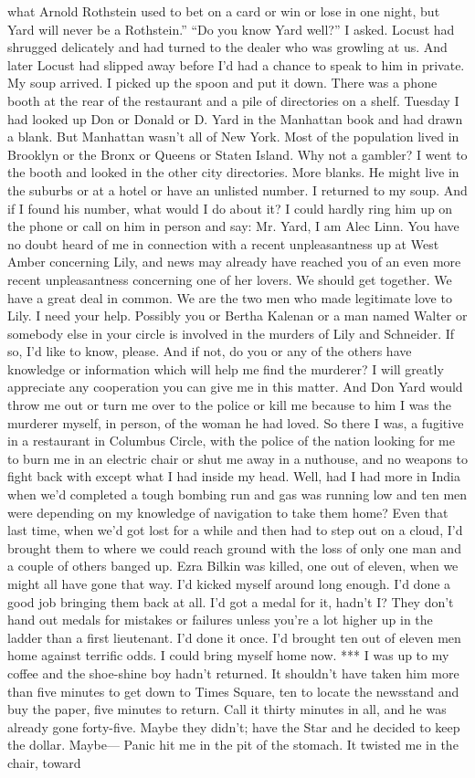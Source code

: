 \documentclass{novel}
\begin{document}
what Arnold Rothstein used to bet on a card or win or lose in one night, but Yard will never be a Rothstein.” “Do you know Yard well?” I asked. Locust had shrugged delicately and had turned to the dealer who was growling at us. And later Locust had slipped away before I’d had a chance to speak to him in private. My soup arrived. I picked up the spoon and put it down. There was a phone booth at the rear of the restaurant and a pile of directories on a shelf. Tuesday I had looked up Don or Donald or D. Yard in the Manhattan book and had drawn a blank. But Manhattan wasn’t all of New York. Most of the population lived in Brooklyn or the Bronx or Queens or Staten Island. Why not a gambler? I went to the booth and looked in the other city directories. More blanks. He might live in the suburbs or at a hotel or have an unlisted number. I returned to my soup. And if I found his number, what would I do about it? I could hardly ring him up on the phone or call on him in person and say: Mr. Yard, I am Alec Linn. You have no doubt heard of me in connection with a recent unpleasantness up at West Amber concerning Lily, and news may already have reached you of an even more recent unpleasantness concerning one of her lovers. We should get together. We have a great deal in common. We are the two men who made legitimate love to Lily. I need your help. Possibly you or Bertha Kalenan or a man named Walter or somebody else in your circle is involved in the murders of Lily and Schneider. If so, I’d like to know, please. And if not, do you or any of the others have knowledge or information which will help me find the murderer? I will greatly appreciate any cooperation you can give me in this matter. And Don Yard would throw me out or turn me over to the police or kill me because to him I was the murderer myself, in person, of the woman he had loved. So there I was, a fugitive in a restaurant in Columbus Circle, with the police of the nation looking for me to burn me in an electric chair or shut me away in a nuthouse, and no weapons to fight back with except what I had inside my head. Well, had I had more in India when we’d completed a tough bombing run and gas was running low and ten men were depending on my knowledge of navigation to take them home? Even that last time, when we’d got lost for a while and then had to step out on a cloud, I’d brought them to where we could reach ground with the loss of only one man and a couple of others banged up. Ezra Bilkin was killed, one out of eleven, when we might all have gone that way. I’d kicked myself around long enough. I’d done a good job bringing them back at all. I’d got a medal for it, hadn’t I? They don’t hand out medals for mistakes or failures unless you’re a lot higher up in the ladder than a first lieutenant. I’d done it once. I’d brought ten out of eleven men home against terrific odds. I could bring myself home now. *** I was up to my coffee and the shoe-shine boy hadn’t returned. It shouldn’t have taken him more than five minutes to get down to Times Square, ten to locate the newsstand and buy the paper, five minutes to return. Call it thirty minutes in all, and he was already gone forty-five. Maybe they didn’t; have the Star and he decided to keep the dollar. Maybe— Panic hit me in the pit of the stomach. It twisted me in the chair, toward 
\end{document}
